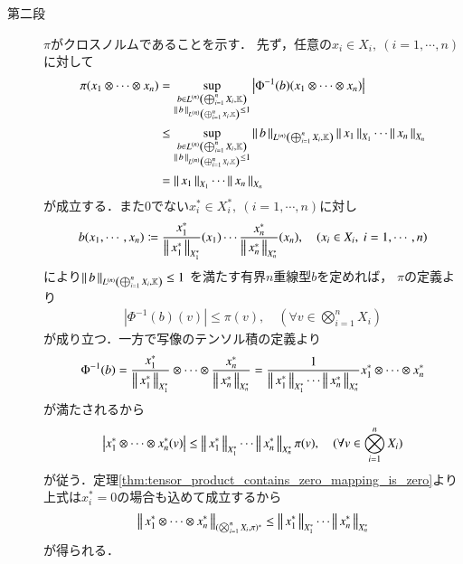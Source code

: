 \begin{prf}
\begin{description}
			\item[第二段]
				$\pi$がクロスノルムであることを示す．
				先ず，任意の$x_i \in X_i,\ (i=1,\cdots,n)$に対して
				\begin{align}
					\pi(x_1 \otimes \cdots \otimes x_n) 
					&= \sup{\substack{b \in \ContLn{\bigoplus_{i=1}^n X_i}{\K}{n} \\ \Norm{b}{\ContLn{\bigoplus_{i=1}^n X_i}{\K}{n}} \leq 1}}{\left| \Phi^{-1}(b)(x_1 \otimes \cdots \otimes x_n) \right|} \\
					&\leq \sup{\substack{b \in \ContLn{\bigoplus_{i=1}^n X_i}{\K}{n} \\ \Norm{b}{\ContLn{\bigoplus_{i=1}^n X_i}{\K}{n}} \leq 1}}{\Norm{b}{\ContLn{\bigoplus_{i=1}^n X_i}{\K}{n}}\Norm{x_1}{X_1} \cdots \Norm{x_n}{X_n}} \\
					&= \Norm{x_1}{X_1} \cdots \Norm{x_n}{X_n}
				\end{align}
				が成立する．また0でない$x_i^* \in X_i^*,\ (i=1,\cdots,n)$に対し
				\begin{align}
					b(x_1,\cdots,x_n) 
					\coloneqq \frac{x_1^*}{\Norm{x_1^*}{X_1^*}}(x_1) \cdots \frac{x_n^*}{\Norm{x_n^*}{X_n^*}}(x_n),
					\quad (x_i \in X_i,\ i=1,\cdots,n)
				\end{align}
				により$\Norm{b}{\ContLn{\bigoplus_{i=1}^n X_i}{\K}{n}} \leq 1$
				を満たす有界$n$重線型$b$を定めれば，
				$\pi$の定義より
				\begin{align}
					\left| \Phi^{-1}(b)(v) \right| \leq \pi(v),
					\quad (\forall v \in \bigotimes_{i=1}^n X_i)
				\end{align}
				が成り立つ．一方で写像のテンソル積の定義より
				\begin{align}
					\Phi^{-1}(b) 
					= \frac{x_1^*}{\Norm{x_1^*}{X_1^*}} 
						\otimes \cdots \otimes \frac{x_n^*}{\Norm{x_n^*}{X_n^*}}
					= \frac{1}{\Norm{x_1^*}{X_1^*} \cdots \Norm{x_n^*}{X_n^*}} 
						x_1^* \otimes \cdots \otimes x_n^*
				\end{align}
				が満たされるから
				\begin{align}
					\left| x_1^* \otimes \cdots \otimes x_n^*(v) \right| 
						\leq \Norm{x_1^*}{X_1^*} \cdots \Norm{x_n^*}{X_n^*} \pi(v),
					\quad (\forall v \in \bigotimes_{i=1}^n X_i)
				\end{align}
				が従う．定理\ref{thm:tensor_product_contains_zero_mapping_is_zero}より
				上式は$x_i^* = 0$の場合も込めて成立するから
				\begin{align}
					\Norm{x_1^* \otimes \cdots \otimes x_n^*}{(\bigotimes_{i=1}^n X_i,\pi)^*} 
					\leq \Norm{x_1^*}{X_1^*} \cdots \Norm{x_n^*}{X_n^*}
				\end{align}
				が得られる．
				

\end{description}
\end{prf}
